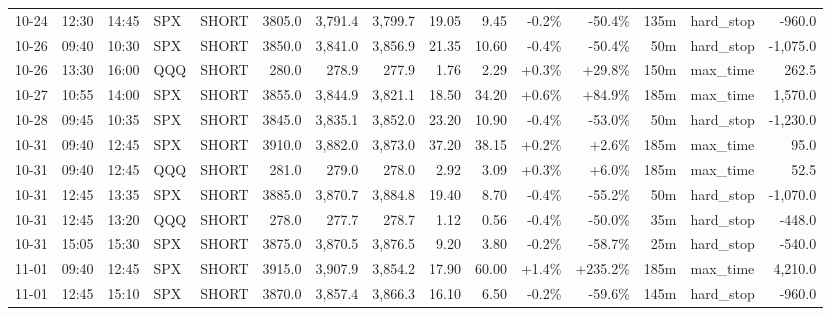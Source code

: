 \documentclass[11pt,a4paper,twoside]{article}
\begin{document}
\begin{landscape}
\begin{center}
\begin{longtable}{>{\color{txtmain}}l l l l l r r r r r r r r >{\color{txtmain}}l r}
10-24 & 12:30 & 14:45 & SPX & SHORT & 3805.0 & 3,791.4 & 3,799.7 & 19.05 & 9.45 & \textcolor{lossred}{-0.2\%} & \textcolor{lossred}{-50.4\%} & 135m & hard\_stop & \textcolor{lossred}{-960.0} \\
10-26 & 09:40 & 10:30 & SPX & SHORT & 3850.0 & 3,841.0 & 3,856.9 & 21.35 & 10.60 & \textcolor{lossred}{-0.4\%} & \textcolor{lossred}{-50.4\%} & 50m & hard\_stop & \textcolor{lossred}{-1,075.0} \\
10-26 & 13:30 & 16:00 & QQQ & SHORT & 280.0 & 278.9 & 277.9 & 1.76 & 2.29 & \textcolor{wingreen}{+0.3\%} & \textcolor{wingreen}{+29.8\%} & 150m & max\_time & \textcolor{wingreen}{262.5} \\
10-27 & 10:55 & 14:00 & SPX & SHORT & 3855.0 & 3,844.9 & 3,821.1 & 18.50 & 34.20 & \textcolor{wingreen}{+0.6\%} & \textcolor{wingreen}{+84.9\%} & 185m & max\_time & \textcolor{wingreen}{1,570.0} \\
10-28 & 09:45 & 10:35 & SPX & SHORT & 3845.0 & 3,835.1 & 3,852.0 & 23.20 & 10.90 & \textcolor{lossred}{-0.4\%} & \textcolor{lossred}{-53.0\%} & 50m & hard\_stop & \textcolor{lossred}{-1,230.0} \\
10-31 & 09:40 & 12:45 & SPX & SHORT & 3910.0 & 3,882.0 & 3,873.0 & 37.20 & 38.15 & \textcolor{wingreen}{+0.2\%} & \textcolor{wingreen}{+2.6\%} & 185m & max\_time & \textcolor{wingreen}{95.0} \\
10-31 & 09:40 & 12:45 & QQQ & SHORT & 281.0 & 279.0 & 278.0 & 2.92 & 3.09 & \textcolor{wingreen}{+0.3\%} & \textcolor{wingreen}{+6.0\%} & 185m & max\_time & \textcolor{wingreen}{52.5} \\
10-31 & 12:45 & 13:35 & SPX & SHORT & 3885.0 & 3,870.7 & 3,884.8 & 19.40 & 8.70 & \textcolor{lossred}{-0.4\%} & \textcolor{lossred}{-55.2\%} & 50m & hard\_stop & \textcolor{lossred}{-1,070.0} \\
10-31 & 12:45 & 13:20 & QQQ & SHORT & 278.0 & 277.7 & 278.7 & 1.12 & 0.56 & \textcolor{lossred}{-0.4\%} & \textcolor{lossred}{-50.0\%} & 35m & hard\_stop & \textcolor{lossred}{-448.0} \\
10-31 & 15:05 & 15:30 & SPX & SHORT & 3875.0 & 3,870.5 & 3,876.5 & 9.20 & 3.80 & \textcolor{lossred}{-0.2\%} & \textcolor{lossred}{-58.7\%} & 25m & hard\_stop & \textcolor{lossred}{-540.0} \\
11-01 & 09:40 & 12:45 & SPX & SHORT & 3915.0 & 3,907.9 & 3,854.2 & 17.90 & 60.00 & \textcolor{wingreen}{+1.4\%} & \textcolor{wingreen}{+235.2\%} & 185m & max\_time & \textcolor{wingreen}{4,210.0} \\
11-01 & 12:45 & 15:10 & SPX & SHORT & 3870.0 & 3,857.4 & 3,866.3 & 16.10 & 6.50 & \textcolor{lossred}{-0.2\%} & \textcolor{lossred}{-59.6\%} & 145m & hard\_stop & \textcolor{lossred}{-960.0} \\

\end{longtable}
\end{center}
\end{landscape}
\end{document}
